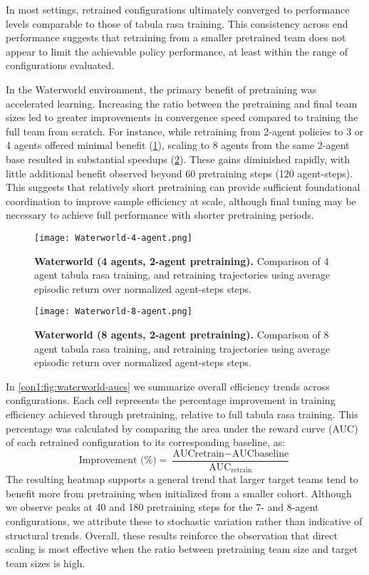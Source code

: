 \documentclass{article}
\begin{document}
In most settings, retrained configurations ultimately converged to 
performance levels comparable to those of tabula rasa training.
This consistency across end performance suggests that retraining from a smaller 
pretrained team does not appear to limit the achievable policy performance, 
at least within the range of configurations evaluated.

In the Waterworld environment, the primary benefit of pretraining was accelerated learning. 
Increasing the ratio between the pretraining and final team sizes led to greater improvements 
in convergence speed compared to training the full team from scratch. For instance, 
while retraining from 2-agent policies to 3 or 4 agents offered minimal benefit 
(\cref{con1:fig:waterworld-4}), scaling to 8 agents from the same 2-agent base resulted in 
substantial speedups (\cref{con1:fig:waterworld-8}). These gains diminished rapidly, 
with little additional benefit observed beyond 60 pretraining steps (120 agent-steps).
This suggests that relatively short pretraining can provide sufficient foundational 
coordination to improve sample efficiency at scale, although final tuning may 
be necessary to achieve full performance with shorter pretraining periods.

\begin{figure}[!ht]
    \centering
    \texttt{[image: Waterworld-4-agent.png]}
    \caption{\textbf{Waterworld (4 agents, 2-agent pretraining).} Comparison of 
    4 agent tabula rasa training, and retraining trajectories using average 
    episodic return over normalized agent-steps steps.}
    \label{con1:fig:waterworld-4}
\end{figure}

\begin{figure}[!ht]
    \centering
    \texttt{[image: Waterworld-8-agent.png]}
    \caption{\textbf{Waterworld (8 agents, 2-agent pretraining).} Comparison of 
    8 agent tabula rasa training, and retraining trajectories using average 
    episodic return over normalized agent-steps steps.}
    \label{con1:fig:waterworld-8}
\end{figure}

In \cref{con1:fig:waterworld-aucs} we summarize overall efficiency trends across configurations. 
Each cell represents the percentage improvement in training efficiency 
achieved through pretraining, relative to full tabula rasa training.
This percentage was calculated by comparing the area under the reward curve 
(AUC) of each retrained configuration to its corresponding baseline, as:
\[
    \text{Improvement (\%)} 
    = \frac{\text{AUC}{\text{retrain}} - \text{AUC}{\text{baseline}}}{\text{AUC}_{\text{retrain}}}
\]
The resulting heatmap supports a general trend that larger target teams tend to 
benefit more from pretraining when initialized from a smaller cohort.
Although we observe peaks at 40 and 180 pretraining steps for the 7- and 8-agent configurations, 
we attribute these to stochastic variation rather than indicative of structural trends.
Overall, these results reinforce the observation that direct scaling is most effective 
when the ratio between pretraining team size and target team sizes is high.
\end{document}
